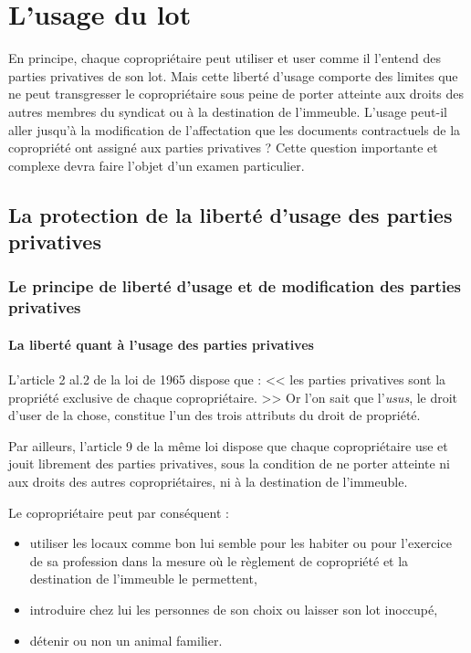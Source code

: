 \chapter{L'usage du lot}

En principe, chaque copropriétaire peut utiliser et user comme il l'entend des parties privatives de son lot. Mais cette liberté d'usage comporte des limites que ne peut transgresser le copropriétaire sous peine de porter atteinte aux droits des autres membres du syndicat ou à la destination de l'immeuble. L'usage peut-il aller jusqu'à la modification de l'affectation que les documents contractuels de la copropriété ont assigné aux parties privatives ? Cette question importante et complexe devra faire l'objet d'un examen particulier.

\section{La protection de la liberté d'usage des parties privatives}

	\subsection{Le principe de liberté d’usage et de modification des parties privatives}
	
		\subsubsection{La liberté quant à l’usage des parties privatives}
		
			L'article 2 al.2 de la loi de 1965 dispose que : << les parties privatives sont la propriété exclusive de chaque copropriétaire. >> Or l'on sait que l'\emph{usus}, le droit d'user de la chose, constitue l'un des trois attributs du droit de propriété.
			
			Par ailleurs, l'article 9 de la même loi dispose que chaque copropriétaire use et jouit librement des parties privatives, sous la condition de ne porter atteinte ni aux droits des autres copropriétaires, ni à la destination de l'immeuble.
			
			Le copropriétaire peut par conséquent :
			\begin{itemize}
				\item utiliser les locaux comme bon lui semble pour les habiter ou pour l'exercice de sa profession dans la mesure où le règlement de copropriété et la destination de l'immeuble le permettent,
				\item introduire chez lui les personnes de son choix ou laisser son lot inoccupé,
				\item détenir ou non un animal familier.
			\end{itemize}
		
